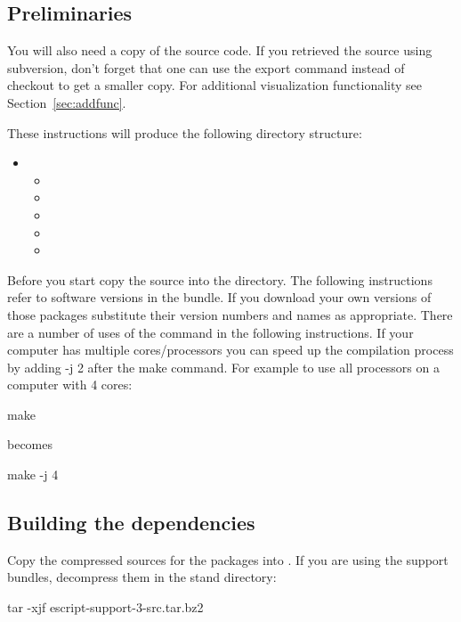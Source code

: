 \subsection{Preliminaries}
\label{sec:prelim}
You will also need a copy of the \esfinley source code.
If you retrieved the source using subversion, don't forget that one can use the export command instead of checkout to get a smaller copy.
For additional visualization functionality see Section~\ref{sec:addfunc}.

These instructions will produce the following directory structure:
\begin{itemize}
 \item[]  \begin{itemize}
  \item[] 
  \item[] 
  \item[] 
  \item[] 
  \item[] 
 \end{itemize}
\end{itemize}

Before you start copy the \esfinley source into the  directory.
The following instructions refer to software versions in the  bundle.
If you download your own versions of those packages substitute their version numbers and names as appropriate.
There are a number of uses of the  command in the following instructions.
If your computer has multiple cores/processors you can speed up the compilation process by adding -j 2 after the make command.
For example to use all processors on a computer with 4 cores:
\begin{shellCode}
make
\end{shellCode}
becomes
\begin{shellCode}
make -j 4
\end{shellCode}


\subsection{Building the dependencies}

Copy the compressed sources for the packages into .
If you are using the support bundles, decompress them in the stand directory:
\begin{shellCode}
tar -xjf escript-support-3-src.tar.bz2
\end{shellCode}

